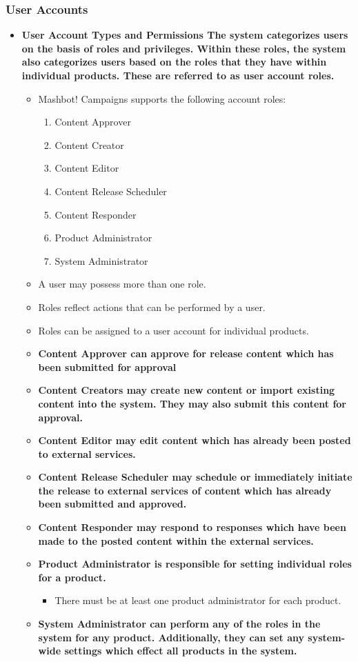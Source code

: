 \documentclass{article}
\begin{document}
		\subsubsection{User Accounts}
			\begin{itemize}
				\item \bf{User Account Types and Permissions} The system categorizes users on the basis
				of roles and privileges. Within these roles, the system also categorizes users based on
			 	the roles that they have within individual products.	These are referred to as user 
				account roles.
				\begin{itemize}
					\item Mashbot! Campaigns supports the following account roles:
						\begin{enumerate}
							\item Content Approver
							\item Content Creator
							\item Content Editor
							\item Content Release Scheduler
							\item Content Responder
							\item Product Administrator
							\item System Administrator
						\end{enumerate}
					\item A user may possess more than one role.
					\item Roles reflect actions that can be performed by a user.
					\item Roles can be assigned to a user account for individual products.
					\item \bf{Content Approver} can approve for release content which has been
					submitted for approval
					\item \bf{Content Creators} may create new content or import existing
					content into the system. They may also submit this content for approval.
					\item \bf{Content Editor} may edit content which has already been posted to external
					services.
					\item \bf{Content Release Scheduler} may schedule or immediately initiate the release 
					to external services of content which has already been submitted and approved.
					\item \bf{Content Responder} may respond to responses which have been made to the posted 
					content within the external services.
				 	\item \bf{Product Administrator} is responsible for setting individual roles for a product.
						\begin{itemize}
							\item There must be at least one product administrator for each product.
						\end{itemize}	
					\item \bf{System Administrator} can perform any of the roles in the system for any product.
					Additionally, they can set any system-wide settings which effect all products in the system.
				\end{itemize}
			\end{itemize}
\end{document}
